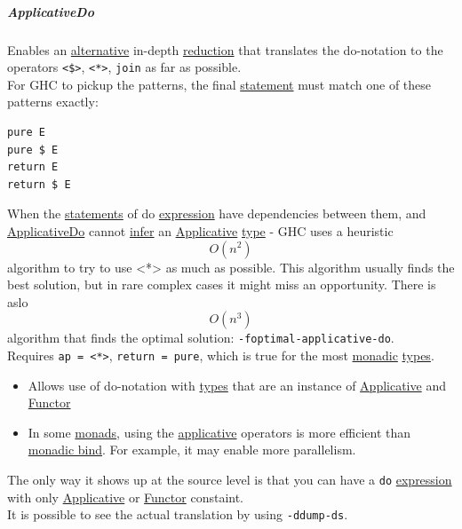 \documentclass[11pt]{article}
\begin{document}
\subparagraph{\label{org7ae5ec6}ApplicativeDo}
\label{sec:org8ae560a}
Enables an \hyperref[org1636559]{alternative} in-depth \hyperref[org102c2e5]{reduction} that translates the do-notation to the operators \texttt{<\$>}, \texttt{<*>}, \texttt{join} as far as possible.\\

For GHC to pickup the patterns, the final \hyperref[org0fdd00d]{statement} must match one of these patterns exactly:\\

\begin{verbatim}
pure E
pure $ E
return E
return $ E
\end{verbatim}

When the \hyperref[org3a604a1]{statements} of do \hyperref[org667db83]{expression} have dependencies between them, and \hyperref[org7ae5ec6]{ApplicativeDo} cannot \hyperref[org774bd97]{infer} an \hyperref[org24a6930]{Applicative} \hyperref[org4fbaeb8]{type} - GHC uses a heuristic $$ O(n^2) $$ algorithm to try to use <*> as much as possible. This algorithm usually finds the best solution, but in rare complex cases it might miss an opportunity. There is aslo $$ O(n^3) $$ algorithm that finds the optimal solution: \texttt{-foptimal-applicative-do}.\\

Requires \texttt{ap = <*>}, \texttt{return = pure}, which is true for the most \hyperref[org5cc37ea]{monadic} \hyperref[org3927fd9]{types}.\\
\begin{itemize}
\item Allows use of do-notation with \hyperref[org3927fd9]{types} that are an instance of \hyperref[org24a6930]{Applicative} and \hyperref[org6073683]{Functor}\\
\item In some \hyperref[org3ecde32]{monads}, using the \hyperref[org24a6930]{applicative} operators is more efficient than \hyperref[orgcde729d]{monadic bind}. For example, it may enable more parallelism.\\
\end{itemize}

The only way it shows up at the source level is that you can have a \texttt{do} \hyperref[org667db83]{expression} with only \hyperref[org24a6930]{Applicative} or \hyperref[org6073683]{Functor} constaint.\\

It is possible to see the actual translation by using \texttt{-ddump-ds}.\\
\end{document}
